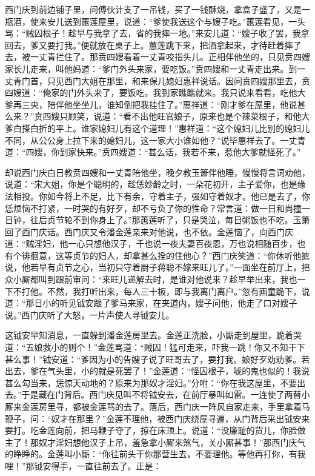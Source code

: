 西门庆到前边铺子里，问傅伙计支了一吊钱，买了一钱酥烧，拿盒子盛了，又是一瓶酒，使来安儿送到蕙莲屋里，说道：“爹使我送这个与嫂子吃。”蕙莲看见，一头骂：“贼囚根子！趁早与我拿了去，省的我摔一地。”来安儿道：“嫂子收了罢，我拿回去，爹又要打我。”便就放在桌子上。蕙莲跳下来，把酒拿起来，才待赶着摔了去，被一丈青拦住了。那贲四嫂看着一丈青咬指头儿。正相伴他坐的，只见贲四嫂家长儿走来，叫他妈道：“爹门外头来家，要吃饭。”贲四嫂和一丈青走出来。到一丈青门首，只见西门大姐在那里，和来保儿媳妇惠祥说话。因问贲四嫂那里去，贲四嫂道：“俺家的门外头来了，要饭吃。我到家瞧瞧就来。我只说来看看，吃他大爹再三央，陪伴他坐坐儿，谁知倒把我挂住了。”惠祥道：“刚才爹在屋里，他说甚么来？”贲四嫂只顾笑，说道：“看不出他旺官娘子，原来也是个辣菜根子，和他大爹白搽白折的平上。谁家媳妇儿有这个道理！”惠祥道：“这个媳妇儿比别的媳妇儿不同，从公公身上拉下来的媳妇儿，这一家大小谁如他？”说毕惠祥去了。一丈青道：“四嫂，你到家快来。”贲四嫂道：“甚么话，我若不来，惹他大爹就怪死了。”

却说西门庆白日教贲四嫂和一丈青陪他坐，晚夕教玉箫伴他睡，慢慢将言词劝他，说道：“宋大姐，你是个聪明的，趁恁妙龄之时，一朵花初开，主子爱你，也是缘法相投。你如今将上不足，比下有余，守着主子，强如守着奴才。他已是去了，你恁烦恼不打紧，一时哭的有好歹，却不亏负了你的性命？常言道：做一日和尚撞一日钟，往后贞节轮不到你身上了。”那蕙莲听了，只是哭泣，每日粥饭也不吃。玉箫回了西门庆话。西门庆又令潘金莲亲来对他说，也不依。金莲恼了，向西门庆道：“贼淫妇，他一心只想他汉子，千也说一夜夫妻百夜恩，万也说相随百步，也有个徘徊意，这等贞节的妇人，却拿甚么拴的住他心？”西门庆笑道：“你休听他摭说，他若早有贞节之心，当初只守着厨子蒋聪不嫁来旺儿了。”一面坐在前厅上，把众小厮都叫到跟前审问：“来旺儿递解去时，是谁对他说来？趁早举出来，我也一下不打他。不然，我打听出来，每人三十板，即与我离门离户。”忽有画童跪下，说道：“那日小的听见钺安跟了爹马来家，在夹道内，嫂子问他，他走了口对嫂子说。”西门庆听了大怒，一片声使人寻钺安儿。

这钺安早知消息，一直躲到潘金莲房里去。金莲正洗脸，小厮走到屋里，跪着哭道：“五娘救小的则个！”金莲骂道：“贼囚！猛可走来，吓我一跳！你又不知干下甚么事！”钺安道：“爹因为小的告嫂子说了旺哥去了，要打我。娘好歹劝劝爹。若出去，爹在气头里，小的就是死罢了！”金莲道：“怪囚根子，唬的鬼也似的！我说甚么勾当来，恁惊天动地的？原来为那奴才淫妇。”分咐：“你在我这屋里，不要出去。”于是藏在门背后。西门庆见叫不将钺安去，在前厅暴叫如雷。一连使了两替小厮来金莲房里寻，都被金莲骂的去了。落后，西门庆一阵风自家走来，手里拿着马鞭子，问：“奴才在那里？”金莲不理他，被西门庆绕屋寻遍，从门背后采出钺安来要打。吃金莲向前，把马鞭子夺了，掠在床顶上。说道：“没廉耻的货儿，你脸做主了！那奴才淫妇想他汉子上吊，羞急拿小厮来煞气，关小厮甚事！”那西门庆气的睁睁的。金莲叫小厮：“你往前头干你那营生去，不要理他。等他再打你，有我哩！”那钺安得手，一直往前去了。正是：

